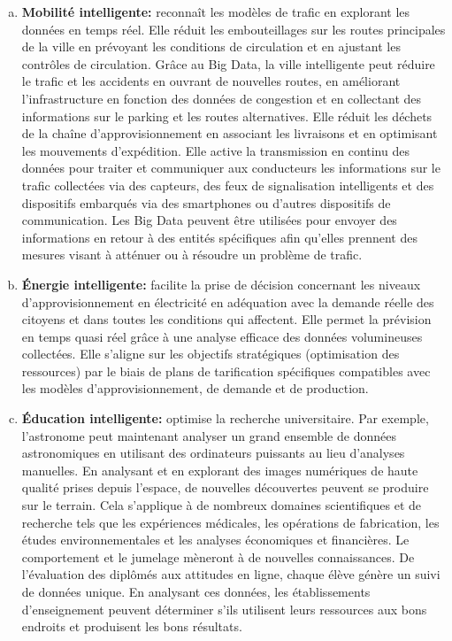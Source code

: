 \documentclass[french, a4paper, 12pt]{report}
\begin{document}
\begin{enumerate}[a.]
\item \textbf{Mobilité intelligente:} reconnaît les modèles de trafic en explorant les données en temps réel. 
Elle réduit les embouteillages sur les routes principales de la ville en prévoyant les conditions de circulation et en ajustant les contrôles de circulation. Grâce au Big Data, la ville intelligente peut réduire le trafic et les accidents en ouvrant de nouvelles routes, en améliorant l'infrastructure en fonction des données de congestion et en collectant des informations sur le parking et les routes alternatives.
Elle réduit les déchets de la chaîne d'approvisionnement en associant les livraisons et en optimisant les mouvements d'expédition.
Elle active la transmission en continu des données pour traiter et communiquer aux conducteurs les informations sur le trafic collectées via des capteurs, des feux de signalisation intelligents et des dispositifs embarqués via des smartphones ou d'autres dispositifs de communication.
Les Big Data peuvent être utilisées pour envoyer des informations en retour à des entités spécifiques afin qu’elles prennent des mesures visant à atténuer ou à résoudre un problème de trafic.\\

\item \textbf{Énergie intelligente:} facilite la prise de décision concernant les niveaux d'approvisionnement en électricité en adéquation avec la demande réelle des citoyens et dans toutes les conditions qui affectent.
Elle permet la prévision en temps quasi réel grâce à une analyse efficace des données volumineuses collectées.
Elle s’aligne sur les objectifs stratégiques (optimisation des ressources) par le biais de plans de tarification spécifiques compatibles avec les modèles d'approvisionnement, de demande et de production.\\

\item \textbf{Éducation intelligente:} optimise la recherche universitaire. Par exemple, l'astronome peut maintenant analyser un grand ensemble de données astronomiques en utilisant des ordinateurs puissants au lieu d'analyses manuelles. En analysant et en explorant des images numériques de haute qualité prises depuis l'espace, de nouvelles découvertes peuvent se produire sur le terrain. Cela s'applique à de nombreux domaines scientifiques et de recherche tels que les expériences médicales, les opérations de fabrication, les études environnementales et les analyses économiques et financières.
Le comportement et le jumelage mèneront à de nouvelles connaissances. De l'évaluation des diplômés aux attitudes en ligne, chaque élève génère un suivi de données unique. En analysant ces données, les établissements d’enseignement peuvent déterminer s’ils utilisent leurs ressources aux bons endroits et produisent les bons résultats.\\


\end{enumerate}
\end{document}
